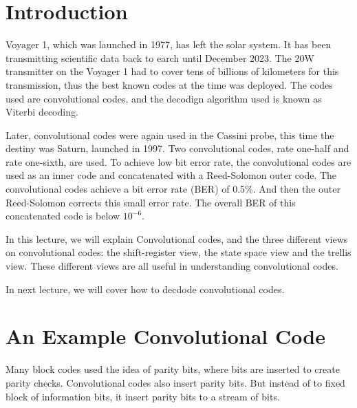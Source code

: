 \Contributor{}

\lstset{style=mystyle}

	\MakeScribeTop


\section{Introduction}

Voyager 1, which was launched in 1977, has left the solar system. It has been transmitting scientific data back to earch until December 2023.  The 20W transmitter on the Voyager 1 had to cover tens of billions of kilometers for this transmission, thus the best known codes at the time was deployed. The codes used are convolutional codes, and the decodign algorithm used is known as Viterbi decoding. 

Later, convolutional codes were again used in the Cassini probe, this time the destiny was Saturn, launched in 1997.  Two convolutional codes, rate one-half and rate one-sixth, are used. To achieve low bit error rate, the convolutional codes are used as an inner code and concatenated with a Reed-Solomon outer code. 
The convolutional codes achieve a bit error rate (BER) of 0.5\%.  And then the outer Reed-Solomon corrects this small error rate. The overall BER of this concatenated code is below \(10^{-6}\).

In this lecture, we will explain Convolutional codes, and the three different views on convolutional codes: the shift-register view, the state space view and the trellis view. These different views are all useful in understanding convolutional codes. 

In next lecture, we will cover how to decdode convolutional codes.

\section{An Example Convolutional Code}
Many block codes used the idea of parity bits, where bits are inserted to create parity checks. Convolutional codes also insert parity bits. But instead of to fixed block of information bits, it insert parity bits to a stream of bits. 


